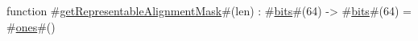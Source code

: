 function #\hyperref[zgetRepresentableAlignmentMask]{getRepresentableAlignmentMask}#(len) : #\hyperref[zbits]{bits}#(64) -> #\hyperref[zbits]{bits}#(64) = #\hyperref[zones]{ones}#()

